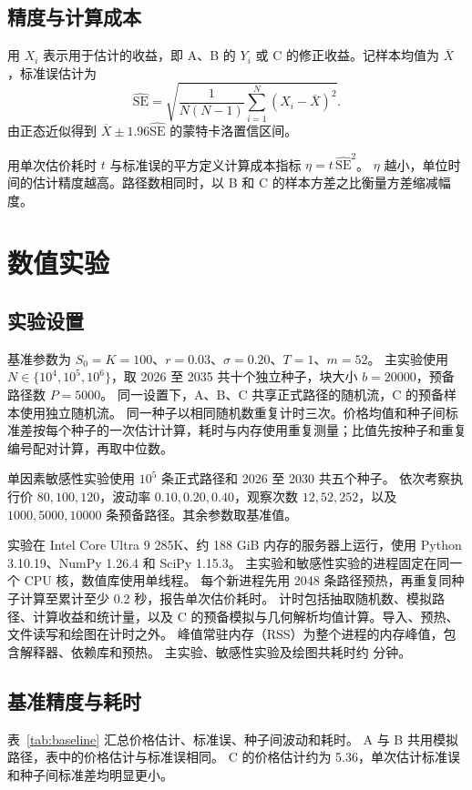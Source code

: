 \subsection{精度与计算成本}
用 \(X_i\) 表示用于估计的收益，即 A、B 的 \(Y_i\) 或 C 的修正收益。记样本均值为 \(\overline X\)，标准误估计为
\begin{equation}
\widehat{\mathrm{SE}}=
\sqrt{\frac{1}{N(N-1)}\sum_{i=1}^N(X_i-\overline X)^2}.
\end{equation}
由正态近似得到 \(\overline X\pm1.96\widehat{\mathrm{SE}}\) 的蒙特卡洛置信区间。

用单次估价耗时 \(t\) 与标准误的平方定义计算成本指标 \(\eta=t\,\widehat{\mathrm{SE}}^2\)。
\(\eta\) 越小，单位时间的估计精度越高。路径数相同时，以 B 和 C 的样本方差之比衡量方差缩减幅度。

\section{数值实验}
\subsection{实验设置}
基准参数为 \(S_0=K=100\)、\(r=0.03\)、\(\sigma=0.20\)、\(T=1\)、\(m=52\)。
主实验使用 \(N\in\{10^4,10^5,10^6\}\)，取 2026 至 2035 共十个独立种子，块大小 \(b=20000\)，预备路径数 \(P=5000\)。
同一设置下，A、B、C 共享正式路径的随机流，C 的预备样本使用独立随机流。
同一种子以相同随机数重复计时三次。价格均值和种子间标准差按每个种子的一次估计计算，耗时与内存使用重复测量；比值先按种子和重复编号配对计算，再取中位数。

单因素敏感性实验使用 \(10^5\) 条正式路径和 2026 至 2030 共五个种子。
依次考察执行价 \(80,100,120\)，波动率 \(0.10,0.20,0.40\)，观察次数 \(12,52,252\)，以及 \(1000,5000,10000\) 条预备路径。其余参数取基准值。

实验在 Intel Core Ultra 9 285K、约 188 GiB 内存的服务器上运行，使用 Python 3.10.19、NumPy 1.26.4 和 SciPy 1.15.3。
主实验和敏感性实验的进程固定在同一个 CPU 核，数值库使用单线程。
每个新进程先用 2048 条路径预热，再重复同种子计算至累计至少 0.2 秒，报告单次估价耗时。
计时包括抽取随机数、模拟路径、计算收益和统计量，以及 C 的预备模拟与几何解析均值计算。导入、预热、文件读写和绘图在计时之外。
峰值常驻内存（RSS）为整个进程的内存峰值，包含解释器、依赖库和预热。
主实验、敏感性实验及绘图共耗时约 \PaperRuntime{} 分钟。

\subsection{基准精度与耗时}
表~\ref{tab:baseline} 汇总价格估计、标准误、种子间波动和耗时。
A 与 B 共用模拟路径，表中的价格估计与标准误相同。
C 的价格估计约为 5.36，单次估计标准误和种子间标准差均明显更小。

